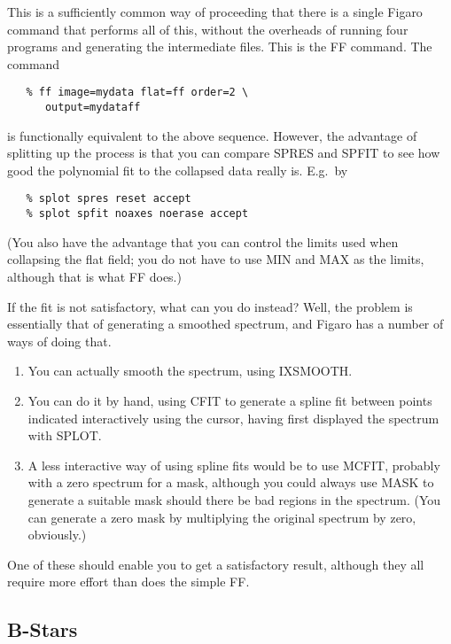 This is a sufficiently common way of proceeding that there is a single
Figaro command that performs all of this, without the overheads of running
four programs and generating the intermediate files.  This is the FF command.
The command

\begin{verbatim}
   % ff image=mydata flat=ff order=2 \
      output=mydataff
\end{verbatim}

is functionally equivalent to the above sequence.  However, the advantage
of splitting up the process is that you can compare SPRES and SPFIT to
see how good the polynomial fit to the collapsed data really is.  E.g.\ by

\begin{verbatim}
   % splot spres reset accept
   % splot spfit noaxes noerase accept
\end{verbatim}

(You also have the advantage that you can control the limits used
when collapsing the flat field; you do not have to use MIN and MAX as
the limits, although that is what FF does.)

If the fit is not satisfactory, what can you do instead?  Well,
the problem is essentially that of generating a smoothed spectrum, and
Figaro has a number of ways of doing that.

\begin{enumerate}
\item You can actually smooth the spectrum, using IXSMOOTH.
\item You can do it by hand, using CFIT to generate a spline fit between
points indicated interactively using the cursor, having first displayed
the spectrum with SPLOT.
\item A less interactive way of using spline fits would be to use MCFIT,
probably with a zero spectrum for a mask, although you could always use
MASK to generate a suitable mask should there be bad regions in the 
spectrum.  (You can generate a zero mask by multiplying the original
spectrum by zero, obviously.)
\end{enumerate}

One of these should enable you to get a satisfactory result, although
they all require more effort than does the simple FF.


\subsection{B-Stars}

